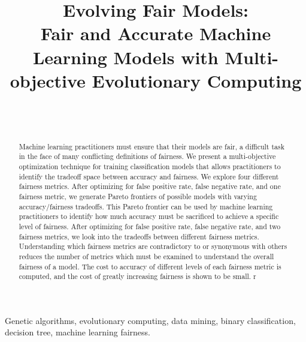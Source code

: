 \documentclass[twoside]{article}
\begin{document}
\title{\bf Evolving Fair Models: \\
Fair and Accurate Machine Learning Models with Multi-objective Evolutionary Computing}  

\author{ \hfill {}\\ 
\AND
        \hfill {}\\
}

\maketitle

\begin{abstract}

Machine learning practitioners must ensure that their models are fair, a difficult task in the face of many conflicting definitions of fairness. We present a multi-objective optimization technique for training classification models that allows practitioners to identify the tradeoff space between accuracy and fairness. We explore four different fairness metrics. After optimizing for false positive rate, false negative rate, and one fairness metric, we generate Pareto frontiers of possible models with varying accuracy/fairness tradeoffs. This Pareto frontier can be used by machine learning practitioners to identify how much accuracy must be sacrificed to achieve a specific level of fairness. After optimizing for false positive rate, false negative rate, and two fairness metrics, we look into the tradeoffs between different fairness metrics. Understanding which fairness metrics are contradictory to or synonymous with others reduces the number of metrics which must be examined to understand the overall fairness of a model. The cost to accuracy of different levels of each fairness metric is computed, and the cost of greatly increasing fairness is shown to be small.
r
\end{abstract}

\begin{keywords}

Genetic algorithms, 
evolutionary computing,
data mining, 
binary classification, 
decision tree, 
machine learning fairness.

\end{keywords}
\end{document}
